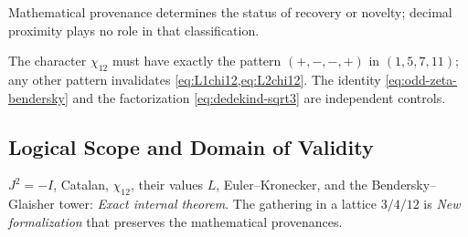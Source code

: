 Mathematical provenance determines the status of recovery or
novelty; decimal proximity plays no role in that classification.

\begin{remark}
The character \(\chi_{12}\) must have exactly the pattern
\((+,-,-,+)\) in \((1,5,7,11)\); any other pattern invalidates
\cref{eq:L1chi12,eq:L2chi12}. The identity
\cref{eq:odd-zeta-bendersky} and the factorization
\cref{eq:dedekind-sqrt3} are independent controls.
\end{remark}

\subsection*{Logical Scope and Domain of Validity}
\(J^2=-I\), Catalan, \(\chi_{12}\), their values \(L\), Euler--Kronecker, and the Bendersky--Glaisher tower: \emph{Exact internal theorem}. The gathering in a lattice \(3/4/12\) is \emph{New formalization} that preserves the mathematical provenances.

